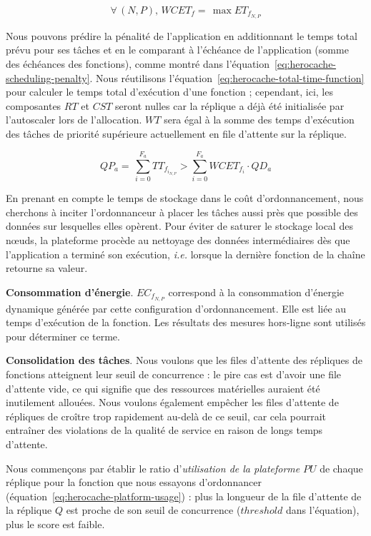 {\begin{equation}
    \forall \, (N, P), \, WCET_{f} = \, \max ET_{f_{N, P}}
\label{eq:herocache-task-wcet}
\end{equation}

Nous pouvons prédire la pénalité de l'application en additionnant le temps total prévu pour ses tâches et en le comparant à l'échéance de l'application (somme des échéances des fonctions), comme montré dans l'équation~\ref{eq:herocache-scheduling-penalty}. Nous réutilisons l'équation~\ref{eq:herocache-total-time-function} pour calculer le temps total d'exécution d'une fonction ; cependant, ici, les composantes $RT$ et $CST$ seront nulles car la réplique a déjà été initialisée par l'autoscaler lors de l'allocation. $WT$ sera égal à la somme des temps d'exécution des tâches de priorité supérieure actuellement en file d'attente sur la réplique.

\begin{equation}
   QP_{a} = \, \sum_{i = 0}^{F_a} TT_{{f}_{{i}_{N, P}}} > \sum_{i = 0}^{F_a} WCET_{f_{i}} \cdot QD_{a}
\label{eq:herocache-scheduling-penalty}
\end{equation}

En prenant en compte le temps de stockage dans le coût d'ordonnancement, nous cherchons à inciter l'ordonnanceur à placer les tâches aussi près que possible des données sur lesquelles elles opèrent. Pour éviter de saturer le stockage local des nœuds, la plateforme procède au nettoyage des données intermédiaires dès que l'application a terminé son exécution, \textit{i.e.} lorsque la dernière fonction de la chaîne retourne sa valeur.

\textbf{Consommation d'énergie}. ${EC}_{{f}_{N, P}}$ correspond à la consommation d'énergie dynamique générée par cette configuration d'ordonnancement. Elle est liée au temps d'exécution de la fonction. Les résultats des mesures hors-ligne sont utilisés pour déterminer ce terme.

\textbf{Consolidation des tâches}. Nous voulons que les files d'attente des répliques de fonctions atteignent leur seuil de concurrence : le pire cas est d'avoir une file d'attente vide, ce qui signifie que des ressources matérielles auraient été inutilement allouées. Nous voulons également empêcher les files d'attente de répliques de croître trop rapidement au-delà de ce seuil, car cela pourrait entraîner des violations de la qualité de service en raison de longs temps d'attente.

Nous commençons par établir le ratio d'\textit{utilisation de la plateforme} $PU$ de chaque réplique pour la fonction que nous essayons d'ordonnancer (équation~\ref{eq:herocache-platform-usage}) : plus la longueur de la file d'attente de la réplique $Q$ est proche de son seuil de concurrence ($threshold$ dans l'équation), plus le score est faible.

}
